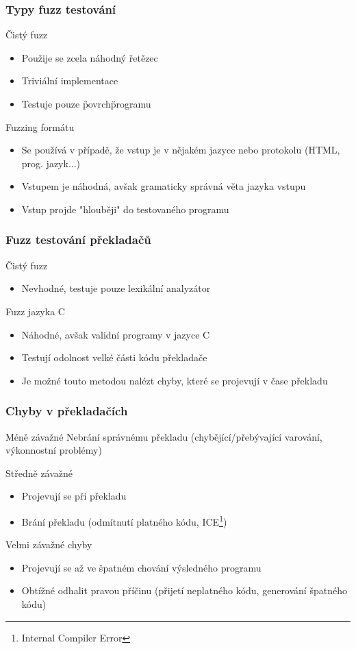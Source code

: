 \documentclass{beamer}
\begin{document}
\frame
{
  \frametitle{Typy fuzz testování}
  \begin{block}{Čistý fuzz}
  \begin{itemize}
    \item Použije se zcela náhodný řetězec
    \item Triviální implementace
    \item Testuje pouze \"povrch\" programu
  \end{itemize}
  \end{block}
  \begin{block}{Fuzzing formátu}
  \begin{itemize}
    \item Se používá v případě, že vstup je v nějakém jazyce nebo protokolu (HTML, prog. jazyk...)
    \item Vstupem je náhodná, avšak gramaticky správná věta jazyka vstupu
    \item Vstup projde "hlouběji" do testovaného programu
  \end{itemize}
  \end{block}
}

\frame
{
  \frametitle{Fuzz testování překladačů}
  \begin{block}{Čistý fuzz}
  \begin{itemize}
  \item Nevhodné, testuje pouze lexikální analyzátor
  \end{itemize}
  \end{block}
  \begin{block}{Fuzz jazyka C}
  \begin{itemize}
    \item Náhodné, avšak validní programy v jazyce C
    \item Testují odolnost velké části kódu překladače
    \item Je možné touto metodou nalézt chyby, které se projevují v čase překladu
    \end{itemize}
  \end{block}
}

\frame
{
  \frametitle{Chyby v překladačích}
  \begin{block}{Méně závažné}
  Nebrání správnému překladu (chybějící/přebývající varování, výkonnostní problémy)
  \end{block}
  \begin{block}{Středně závažné}
  \begin{itemize}
  \item Projevují se při překladu
  \item Brání překladu (odmítnutí platného kódu, ICE\footnote{Internal Compiler Error})
  \end{itemize}
  \end{block}
  \begin{block}{Velmi závažné chyby}
  \begin{itemize}
  \item Projevují se až ve špatném chování výsledného programu
  \item Obtížné odhalit pravou příčinu (přijetí neplatného kódu, generování špatného kódu)
  \end{itemize}
  \end{block}
}
\end{document}
